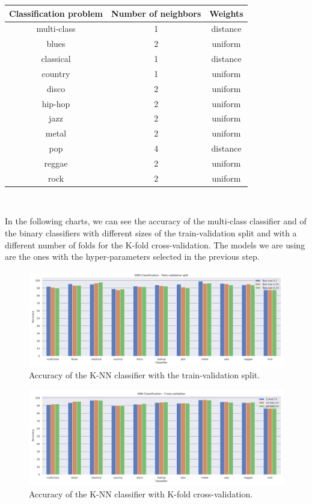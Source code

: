 \documentclass{Configuration_Files/PoliMi3i_thesis}
\begin{document}
\begin{table}[H]
    \centering 
    \begin{tabular}{|c | c c |}
    \hline
    \rowcolor{bluepoli!40} 
     Classification problem & Number of neighbors & Weights \T\B \\
    \hline \hline
    multi-class & 1 & distance   \T\B \\
    blues & 2 & uniform   \T\B \\
    classical & 1 & distance   \T\B \\
    country & 1 & uniform   \T\B \\
    disco & 2 & uniform   \T\B \\
    hip-hop & 2 & uniform   \T\B \\
    jazz & 2 & uniform   \T\B \\
    metal & 2 & uniform   \T\B \\
    pop & 4 & distance   \T\B \\
    reggae & 2 & uniform   \T\B \\
    rock & 2 & uniform   \T\B \\
    \hline
    \end{tabular}
    \\[10pt]
\end{table}

In the following charts, we can see the accuracy of the multi-class classifier and of the binary classifiers with different sizes of the train-validation split and with a different number of folds for the K-fold cross-validation. The models we are using are the ones with the hyper-parameters selected in the previous step.

\begin{figure}[H]
    \centering
    \includegraphics[width=\textwidth]{Figures/knn_s.png}
    \caption{Accuracy of the K-NN classifier with the train-validation split.}
    \label{fig:knns}
\end{figure}

\begin{figure}[H]
    \centering
    \includegraphics[width=\textwidth]{Figures/knn_d.png}
    \caption{Accuracy of the K-NN classifier with K-fold cross-validation.}
    \label{fig:knnd}
\end{figure}
\end{document}
